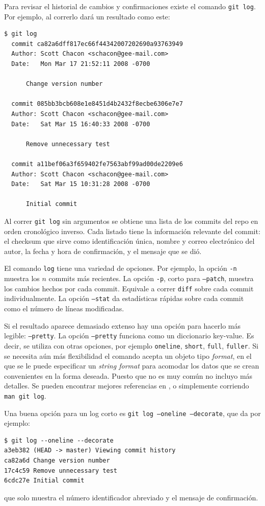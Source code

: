\documentclass[spanish, 12pt, a4paper]{article}
\begin{document}
Para revisar el historial de cambios y confirmaciones existe el comando \texttt{git log}.
Por ejemplo, al correrlo dará un resultado como este:
\begin{lstlisting}
$ git log
  commit ca82a6dff817ec66f44342007202690a93763949
  Author: Scott Chacon <schacon@gee-mail.com>
  Date:   Mon Mar 17 21:52:11 2008 -0700
  
      Change version number
  
  commit 085bb3bcb608e1e8451d4b2432f8ecbe6306e7e7
  Author: Scott Chacon <schacon@gee-mail.com>
  Date:   Sat Mar 15 16:40:33 2008 -0700

      Remove unnecessary test

  commit a11bef06a3f659402fe7563abf99ad00de2209e6
  Author: Scott Chacon <schacon@gee-mail.com>
  Date:   Sat Mar 15 10:31:28 2008 -0700

      Initial commit
\end{lstlisting}

Al correr \texttt{git log} sin argumentos se obtiene una lista de los commits del repo en orden cronológico inverso.
Cada listado tiene la información relevante del commit: el checksum que sirve como identificación única, nombre y correo electrónico del autor, la fecha y hora de confirmación, y el mensaje que se dió.

El comando \texttt{log} tiene una variedad de opciones.
Por ejemplo, la opción \texttt{-n} muestra los $n$ commits más recientes.
La opción \texttt{-p}, corto para \texttt{--patch}, muestra los cambios hechos por cada commit.
Equivale a correr \texttt{diff} sobre cada commit individualmente.
La opción \texttt{--stat} da estadísticas rápidas sobre cada commit como el número de líneas modificadas.

Si el resultado aparece demasiado extenso hay una opción para hacerlo más legible: \texttt{--pretty}.
La opción \texttt{--pretty} funciona como un diccionario key-value.
Es decir, se utiliza con otras opciones, por ejemplo \texttt{oneline}, \texttt{short}, \texttt{full}, \texttt{fuller}.
Si se necesita aún más flexibilidad el comando acepta un objeto tipo \textit{format}, en el que se le puede especificar un \textit{string format} para acomodar los datos que se crean convenientes en la forma deseada.
Puesto que no es muy común no incluyo más detalles. Se pueden encontrar mejores referencias en \cite[pág.~88]{chacon-2009}, o simplemente corriendo \texttt{man git log}.

Una buena opción para un log corto es \texttt{git log --oneline --decorate}, que da por ejemplo:
\begin{lstlisting}
$ git log --oneline --decorate               
a3eb382 (HEAD -> master) Viewing commit history
ca82a6d Change version number
17c4c59 Remove unnecessary test
6cdc27e Initial commit
\end{lstlisting}
que solo muestra el número identificador abreviado y el mensaje de confirmación.
\end{document}
